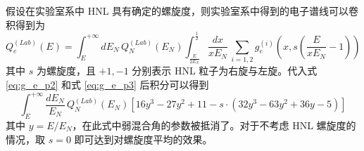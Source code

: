 \documentclass[printMode=false, declarePage=false]{ecnuthesis}
\begin{document}
假设在实验室系中 HNL 具有确定的螺旋度，则实验室系中得到的电子谱线可以卷积得到为
\begin{equation}
  Q_e^{(Lab)}(E) = \int_{E}^{+\infty} d E_N \, Q_N^{(Lab)}(E_N) \int_{\frac{E}{2 E_N}}^{\frac{1}{2}}  \frac{d x}{x E_N} \, \sum_{i=1,2} g_e^{(i)}(x, s (\frac{E}{x E_N} - 1))
\end{equation}
其中 $s$ 为螺旋度，且 $+1,-1$ 分别表示 HNL 粒子为右旋与左旋。代入式 \ref{eq:g_e_p2} 和式 \ref{eq:g_e_p3} 后积分可以得到
\begin{equation}
  \int_{E}^{+\infty} \frac{d E_N}{E_N} \, Q_N^{(Lab)}(E_N) [16 y^3 - 27 y^2 + 11 -  s \cdot (32 y^3 - 63 y^2 + 36 y - 5) ]
\end{equation}
其中 $y=E/E_N$，在此式中弱混合角的参数被抵消了。对于不考虑 HNL 螺旋度的情况，取 $s=0$ 即可达到对螺旋度平均的效果。
\end{document}
